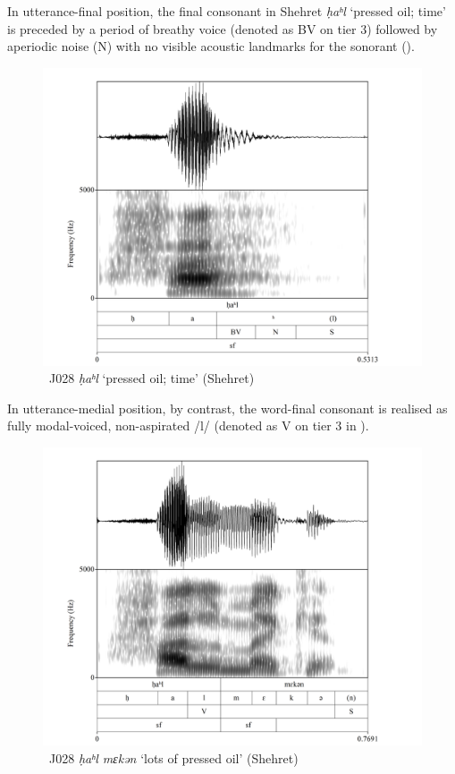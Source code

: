 \documentclass[output=paper]{langscibook}
\begin{document}
In utterance-final position, the final consonant in Shehret \textit{ḥaʰl} ‘pressed oil; time’ is preceded by a period of breathy voice (denoted as BV on tier 3) followed by aperiodic noise (N) with no visible acoustic landmarks for the sonorant ().

\begin{figure}[p]
\includegraphics[height=.4\textheight]{figures/a12Watsonetal-img003.png}
\caption{
  \label{fig:watson:3} J028 \textit{ḥaʰl} ‘pressed oil; time’ (Shehret)}
\end{figure}

In utterance-medial position, by contrast, the word-final consonant is realised as fully modal-voiced, non-aspirated \mbox{/l/} (denoted as V on tier 3 in ).

\begin{figure}[p]
\includegraphics[height=.4\textheight]{figures/a12Watsonetal-img004.png}
\caption{
  \label{fig:watson:4} J028 \textit{ḥaʰl mɛkən} ‘lots of pressed oil’ (Shehret)}
\end{figure}
\end{document}
